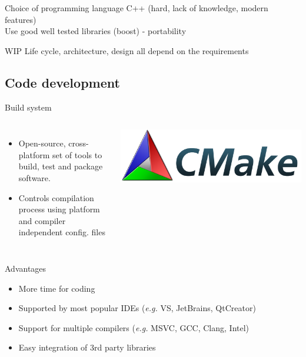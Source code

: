 \documentclass{beamer}
\begin{document}
\begin{frame}{Choice of programming language}
	C++ (hard, lack of knowledge, modern features)\\
	Use good well tested libraries (boost) - portability
\end{frame}

\begin{frame}{WIP}
	Life cycle, architecture, design all depend on the \alert{requirements}
\end{frame}

\subsection{Code development}
\begin{frame}{Build system}
	\begin{columns}[onlytextwidth]
		\begin{itemize}
			\item Open-source, cross-platform set of tools to build, test and package software.
			\item Controls compilation process using platform and compiler independent config. files
		\end{itemize}
		\includegraphics[keepaspectratio=true, width=1\linewidth]{figures/cmake.png}
	\end{columns}
	\vspace{1\baselineskip}
	\begin{quote}
		\centering
	\end{quote}
	\begin{exampleblock}{Advantages}
		\begin{itemize}
			\item More time for coding
			\item Supported by most popular IDEs (\textit{e.g.} VS, JetBrains, QtCreator)
			\item Support for multiple compilers (\textit{e.g.} MSVC, GCC, Clang, Intel)
			\item Easy integration of 3rd party libraries
		\end{itemize}
	\end{exampleblock}	  
\end{frame}
\end{document}
